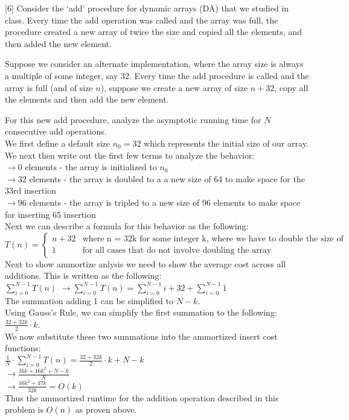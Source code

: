 \documentclass[addpoints, 11pt]{exam}
\begin{document}
\begin{questions}
[6]
Consider the `add' procedure for dynamic arrays (DA) that we studied in class. Every time the add operation was called and the array was full, the procedure created a new array of twice the size and copied all the elements, and then added the new element.

Suppose we consider an alternate implementation, where the array size is always a multiple of some integer, say 32. Every time the add procedure is called and the array is full (and of size $n$), suppose we create a new array of size $n + 32$, copy all the elements and then add the new element.

For this new add procedure, analyze the asymptotic running time for $N$ consecutive add operations.  \\
We first define a default size $n_0 = 32$ which represents the initial size of our array. We next then write out the first few terms to analyze the behavior: \\
$\rightarrow 0$ elements - the array is initialized to $n_0$ \\
$\rightarrow 32$ elements - the array is doubled to a a new size of 64 to make space for the 33rd insertion \\
$\rightarrow 96$ elements - the array is tripled to a new size of 96 elements to make space for inserting 65 insertion \\
Next we can describe a formula for this behavior as the following: \\
\begin{equation}
  T(n)=
    \begin{cases}
      n + 32 &\text{where n = 32k for some integer k, where we have to double the size of the array} \\
      1 & \text{for all cases that do not involve doubling the array}
    \end{cases}
\end{equation}
Next to show ammortize anlysis we need to show the average cost across all additions. This is written as the following: \\
$\sum_{i = 0}^{N-1} T(n)$
$\rightarrow \sum_{i = 0}^{N-1}T(n) = \sum_{i = 0}^{N-1} i + 32 + \sum_{i = 0}^{N - 1} 1$ \\ 
The summation adding 1 can be simplified to $N-k$. \\
Using Gauss's Rule, we can simplify the first summation to the following: \\
$\frac{32 + 32k}{2} \cdot k$. \\
We now substitute these two summations into the  ammortized insert cost functions: \\
$\frac{1}{N} \cdot \sum_{i=0}^{N-1}T(n) = \frac{32 + 32k}{2} \cdot k + N-k$ \\
$\rightarrow \frac{16k + 16k^{2} + N-k}{N}$ \\
$\rightarrow \frac{16k^{2} + 47k}{32k} = O(k)$ \\
Thus the ammortized runtime for the addition operation described in this problem is $O(n)$ as proven above.
\end{questions}
\end{document}
